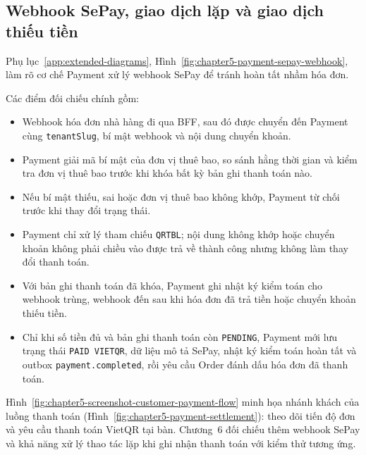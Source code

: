 \subsection{Webhook SePay, giao dịch lặp và giao dịch thiếu tiền}

Phụ lục~\ref{app:extended-diagrams}, Hình~\ref{fig:chapter5-payment-sepay-webhook}, làm rõ cơ chế Payment xử lý webhook SePay để tránh hoàn tất nhầm hóa đơn.

Các điểm đối chiếu chính gồm:

\begin{itemize}
  \item Webhook hóa đơn nhà hàng đi qua BFF, sau đó được chuyển đến Payment cùng \texttt{tenantSlug}, bí mật webhook và nội dung chuyển khoản.
  \item Payment giải mã bí mật của đơn vị thuê bao, so sánh hằng thời gian và kiểm tra đơn vị thuê bao trước khi khóa bất kỳ bản ghi thanh toán nào.
  \item Nếu bí mật thiếu, sai hoặc đơn vị thuê bao không khớp, Payment từ chối trước khi thay đổi trạng thái.
  \item Payment chỉ xử lý tham chiếu \texttt{QRTBL}; nội dung không khớp hoặc chuyển khoản không phải chiều vào được trả về thành công nhưng không làm thay đổi thanh toán.
  \item Với bản ghi thanh toán đã khóa, Payment ghi nhật ký kiểm toán cho webhook trùng, webhook đến sau khi hóa đơn đã trả tiền hoặc chuyển khoản thiếu tiền.
  \item Chỉ khi số tiền đủ và bản ghi thanh toán còn \texttt{PENDING}, Payment mới lưu trạng thái \texttt{PAID VIETQR}, dữ liệu mô tả SePay, nhật ký kiểm toán hoàn tất và outbox \texttt{payment.completed}, rồi yêu cầu Order đánh dấu hóa đơn đã thanh toán.
\end{itemize}

Hình~\ref{fig:chapter5-screenshot-customer-payment-flow} minh họa nhánh khách của luồng thanh toán (Hình~\ref{fig:chapter5-payment-settlement}): theo dõi tiến độ đơn và yêu cầu thanh toán VietQR tại bàn. Chương~6 đối chiếu thêm webhook SePay và khả năng xử lý thao tác lặp khi ghi nhận thanh toán với kiểm thử tương ứng.


